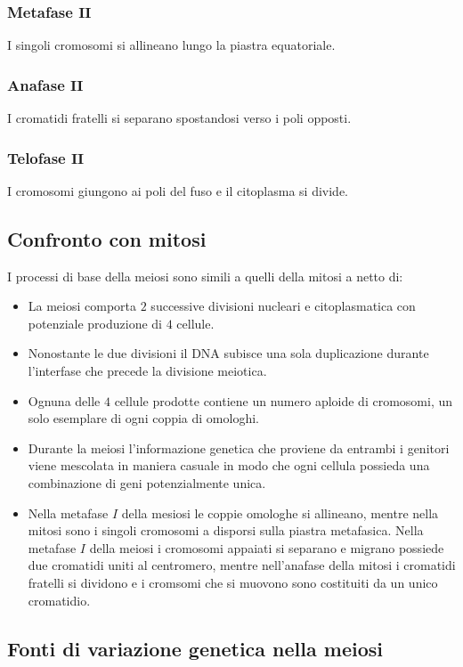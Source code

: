 \subsubsection{Metafase $\mathbf{II}$}
I singoli cromosomi si allineano lungo la piastra equatoriale. 
\subsubsection{Anafase $\mathbf{II}$}
I cromatidi fratelli si separano spostandosi verso i poli opposti. 
\subsubsection{Telofase $\mathbf{II}$}
I cromosomi giungono ai poli del fuso e il citoplasma si divide. 
\subsection{Confronto con mitosi}
I processi di base della meiosi sono simili a quelli della mitosi a netto di:
\begin{itemize}
	\item La meiosi comporta $2$ successive divisioni nucleari e citoplasmatica con potenziale produzione di $4$ cellule. 
	\item Nonostante le due divisioni il DNA subisce una sola duplicazione durante l'interfase che precede la divisione meiotica. 
	\item Ognuna delle $4$ cellule prodotte contiene un numero aploide di cromosomi, un solo esemplare di ogni coppia di omologhi. 
	\item Durante la meiosi l'informazione genetica che proviene da entrambi i genitori viene mescolata in maniera casuale in modo che ogni cellula possieda una combinazione di geni
		potenzialmente unica. 
	\item Nella metafase $I$ della mesiosi le coppie omologhe si allineano, mentre nella mitosi sono i singoli cromosomi a disporsi sulla piastra metafasica. Nella metafase $I$ della meiosi
		i cromosomi appaiati si separano e migrano possiede due cromatidi uniti al centromero, mentre nell'anafase della mitosi i cromatidi fratelli si dividono e i cromsomi che si muovono sono
		costituiti da un unico cromatidio.
\end{itemize}
\subsection{Fonti di variazione genetica nella meiosi}

